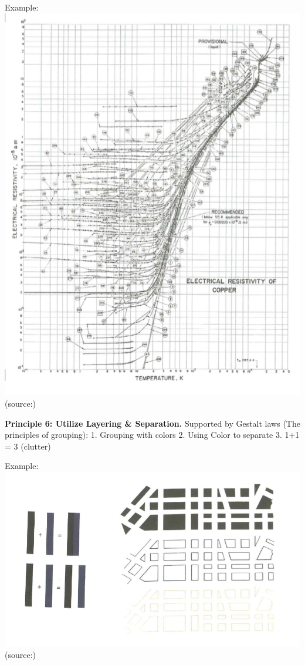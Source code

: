 \documentclass[]{book}
\theoremstyle{definition}
\theoremstyle{definition}
\theoremstyle{definition}
\theoremstyle{remark}
\begin{document}
Example:\\
\includegraphics{images/Tufte_figure9.png} (source:\citep{Tufte_2001})

\textbf{Principle 6: Utilize Layering \& Separation.} Supported by
Gestalt laws (The principles of grouping): 1. Grouping with colors 2.
Using Color to separate 3. 1+1 = 3 (clutter)

Example: \includegraphics{images/Tufte_figure10.png}
(source:\citep{Tufte_2001})
\end{document}
